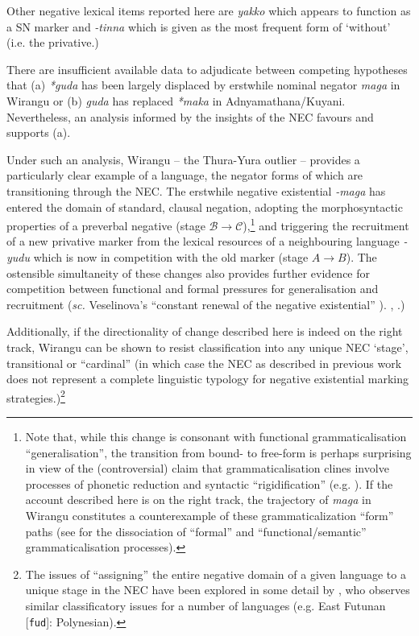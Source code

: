 {{	Other negative lexical items reported here are \textit{yakko} which appears to function as a SN marker and \textit{-tinna} which is given as the most frequent form of `without' (i.e. the privative.)}

 There are insufficient available data to adjudicate between competing hypotheses that (a) \textit{*guda} has been largely displaced by erstwhile nominal negator \textit{maga} in Wirangu or (b) \textit{guda} has replaced \textit{*maka} in Adnyamathana/Kuyani. Nevertheless, an analysis informed by the insights of the NEC favours and supports (a).
 
Under such an analysis, Wirangu -- the Thura-Yura outlier -- provides a particularly clear example of a language, the negator forms of which are transitioning through the NEC. The erstwhile negative existential \textit{-maga} has entered the domain of standard, clausal negation, adopting the morphosyntactic properties of a preverbal negative (stage $\mathcal{B\to C}$),\footnote{Note that, while this change is consonant with functional grammaticalisation ``generalisation'', the transition from bound- to free-form is perhaps surprising in view of the (controversial) claim that grammaticalisation clines involve processes of phonetic reduction and syntactic ``rigidification'' (e.g. \citealp{Geurts2000}). If the account described here is on the right track, the trajectory of \textit{maga} in Wirangu constitutes a counterexample of these grammaticalization ``form'' paths (see \citealp[40]{vanderAuwera2008,Ahern} for the dissociation of ``formal'' and ``functional/semantic'' grammaticalisation processes).} and triggering the recruitment of a new privative marker from the lexical resources of a neighbouring language \textit{-yudu} which is now in competition with the old marker (stage $A\to B$). The ostensible simultaneity of these changes also provides further evidence for competition between functional and formal pressures for generalisation and recruitment (\textit{sc.} Veselinova's ``constant renewal of the negative existential'' \citeyearpar[173]{Veselinova2016}).
\citealt[225]{Miestamo2005}, \citealt{Phillips2021b}.)

Additionally, if the directionality of change described here is indeed on the right track, Wirangu can be shown to resist classification into any unique NEC `stage', transitional or ``cardinal'' (in which case the NEC as described in previous work does not represent a complete linguistic typology for negative existential marking strategies.)\footnote{The issues of ``assigning'' the entire negative domain of a given language to a unique stage in the NEC have been explored in some detail by \citep{Veselinova2016}, who observes similar classificatory issues for a number of languages (e.g. East Futunan [\texttt{fud}]: Polynesian).}










}
